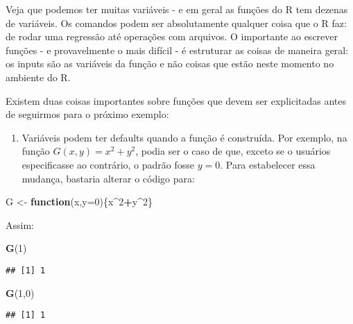 \documentclass[
]{book}
\newenvironment{Shaded}{\begin{snugshade}}{\end{snugshade}}
\newcommand{\ControlFlowTok}[1]{\textcolor[rgb]{0.13,0.29,0.53}{\textbf{#1}}}
\newcommand{\DataTypeTok}[1]{\textcolor[rgb]{0.13,0.29,0.53}{#1}}
\newcommand{\DecValTok}[1]{\textcolor[rgb]{0.00,0.00,0.81}{#1}}
\newcommand{\KeywordTok}[1]{\textcolor[rgb]{0.13,0.29,0.53}{\textbf{#1}}}
\newcommand{\NormalTok}[1]{#1}
\newcommand{\OperatorTok}[1]{\textcolor[rgb]{0.81,0.36,0.00}{\textbf{#1}}}
\newcommand{\StringTok}[1]{\textcolor[rgb]{0.31,0.60,0.02}{#1}}
\providecommand{\tightlist}{%
  \setlength{\itemsep}{0pt}\setlength{\parskip}{0pt}}
\begin{document}
Veja que podemos ter muitas variáveis - e em geral as funções do R tem dezenas de variáveis. Os comandos podem ser absolutamente qualquer coisa que o R faz: de rodar uma regressão até operações com arquivos. O importante ao escrever funções - e provavelmente o mais difícil - é estruturar as coisas de maneira geral: os inputs são as variáveis da função e não coisas que estão neste momento no ambiente do R.

Existem duas coisas importantes sobre funções que devem ser explicitadas antes de seguirmos para o próximo exemplo:

\begin{enumerate}
\def\labelenumi{(\arabic{enumi})}
\setcounter{enumi}{2}
\tightlist
\item
  Variáveis podem ter defaults quando a função é construída. Por exemplo, na função \(G(x,y) = x^2+y^2\), podia ser o caso de que, exceto se o usuários especificasse ao contrário, o padrão fosse \(y = 0\). Para estabelecer essa mudança, bastaria alterar o código para:
\end{enumerate}

\begin{Shaded}
\begin{Highlighting}[]
\NormalTok{G \textless{}{-}}\StringTok{ }\ControlFlowTok{function}\NormalTok{(x,}\DataTypeTok{y=}\DecValTok{0}\NormalTok{)\{x}\OperatorTok{\^{}}\DecValTok{2}\OperatorTok{+}\NormalTok{y}\OperatorTok{\^{}}\DecValTok{2}\NormalTok{\}}
\end{Highlighting}
\end{Shaded}

Assim:

\begin{Shaded}
\begin{Highlighting}[]
\KeywordTok{G}\NormalTok{(}\DecValTok{1}\NormalTok{)}
\end{Highlighting}
\end{Shaded}

\begin{verbatim}
## [1] 1
\end{verbatim}

\begin{Shaded}
\begin{Highlighting}[]
\KeywordTok{G}\NormalTok{(}\DecValTok{1}\NormalTok{,}\DecValTok{0}\NormalTok{)}
\end{Highlighting}
\end{Shaded}

\begin{verbatim}
## [1] 1
\end{verbatim}
\end{document}
